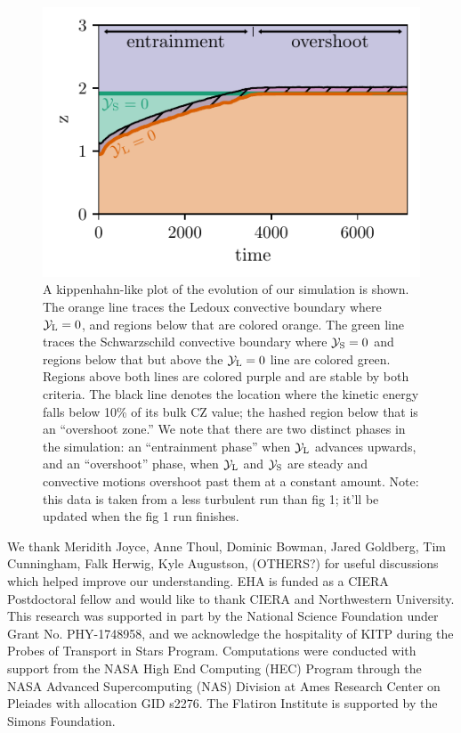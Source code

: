 \documentclass[twocolumn, linenumbers]{aastex631}
\newcommand{\yL}{\ensuremath{\mathcal{Y}_{\rm{L}}}}
\newcommand{\yS}{\ensuremath{\mathcal{Y}_{\rm{S}}}}
\begin{document}
\begin{figure}[t]
\centering
\includegraphics[width=\columnwidth]{kippenhahn.pdf}
\caption{
    A kippenhahn-like plot of the evolution of our simulation is shown.
    The orange line traces the Ledoux convective boundary where $\yL = 0$, and regions below that are colored orange.
    The green line traces the Schwarzschild convective boundary where $\yS = 0$ and regions below that but above the $\yL = 0$ line are colored green.
    Regions above both lines are colored purple and are stable by both criteria.
    The black line denotes the location where the kinetic energy falls below 10\% of its bulk CZ value; the hashed region below that is an ``overshoot zone.''
    We note that there are two distinct phases in the simulation: an ``entrainment phase'' when $\yL$ advances upwards, and an ``overshoot'' phase, when $\yL$ and $\yS$ are steady and convective motions overshoot past them at a constant amount.
    {\color{blue} Note: this data is taken from a less turbulent run than fig 1; it'll be updated when the fig 1 run finishes.}
\label{fig:kippenhahn}
}
\end{figure}





\begin{acknowledgments}
We thank Meridith Joyce, Anne Thoul, Dominic Bowman, Jared Goldberg, Tim Cunningham, Falk Herwig, Kyle Augustson, (OTHERS?) for useful discussions which helped improve our understanding.
EHA is funded as a CIERA Postdoctoral fellow and would like to thank CIERA and Northwestern University. 
This research was supported in part by the National Science Foundation under Grant No. PHY-1748958, and we acknowledge the hospitality of KITP during the Probes of Transport in Stars Program.
Computations were conducted with support from the NASA High End Computing (HEC) Program through the NASA Advanced Supercomputing (NAS) Division at Ames Research Center on Pleiades with allocation GID s2276.
The Flatiron Institute is supported by the Simons Foundation.
\end{acknowledgments}


\appendix







                                                          	



\end{document}
